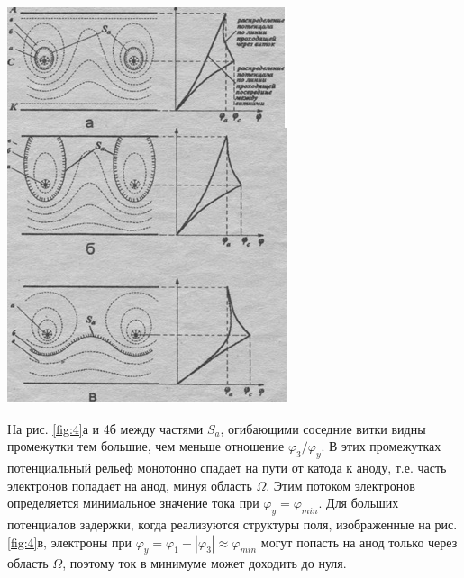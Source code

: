 \begin{center}
    \begin{minipage}[t]{0.5\linewidth}
        \includegraphics[width=\linewidth]{R4.png} 
        \label{fig:4}
        \vspace{-32pt}
    \end{minipage}
\end{center}

На рис. \ref{fig:4}а и 4б между частями $S_a$, огибающими соседние витки видны промежутки тем большие, чем меньше отношение $\varphi_{3} /\varphi_{y}$. В этих промежутках потенциальный рельеф монотонно спадает на пути от катода к аноду, т.е. часть электронов попадает на анод, минуя область $\Omega$. Этим потоком электронов определяется минимальное значение тока при $\varphi_{y}=\varphi_{min}$. Для больших потенциалов задержки, когда реализуются структуры поля, изображенные на рис. \ref{fig:4}в, электроны при $\varphi_{y}= \varphi_{1}+|\varphi_{3}| \approx \varphi_{min}$ могут попасть на анод только через область $\Omega$, поэтому ток в минимуме может доходить до нуля.

